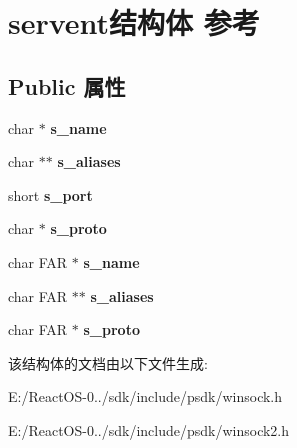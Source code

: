 \hypertarget{structservent}{}\section{servent结构体 参考}
\label{structservent}
\subsection*{Public 属性}
\begin{DoxyCompactItemize}
\item 
\mbox{\label{structservent_a1bdae74e6bdf91235fbba6d08eb4537c}} 
char $\ast$ {\bfseries s\+\_\+name}
\item 
\mbox{\label{structservent_a3f8d3cf12c142b8f0bfab810975783d5}} 
char $\ast$$\ast$ {\bfseries s\+\_\+aliases}
\item 
\mbox{\label{structservent_a1fa4998e0f38c4ef38354505f13c618e}} 
short {\bfseries s\+\_\+port}
\item 
\mbox{\label{structservent_a379e36da163ba55b73d770a27bb2430b}} 
char $\ast$ {\bfseries s\+\_\+proto}
\item 
\mbox{\label{structservent_a385f535e29f379704450c76f21427802}} 
char F\+AR $\ast$ {\bfseries s\+\_\+name}
\item 
\mbox{\label{structservent_a9a63cbb7de29484588cbc33e63bd1c7f}} 
char F\+AR $\ast$$\ast$ {\bfseries s\+\_\+aliases}
\item 
\mbox{\label{structservent_a68c8a6bb196514bad88dcabf9da99633}} 
char F\+AR $\ast$ {\bfseries s\+\_\+proto}
\end{DoxyCompactItemize}


该结构体的文档由以下文件生成\+:\begin{DoxyCompactItemize}
\item 
E\+:/\+React\+O\+S-\/0../sdk/include/psdk/winsock.\+h\item 
E\+:/\+React\+O\+S-\/0../sdk/include/psdk/winsock2.\+h\end{DoxyCompactItemize}
